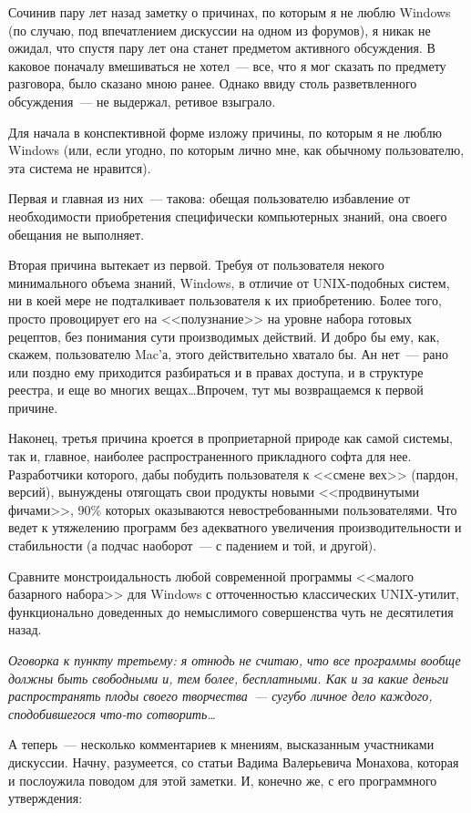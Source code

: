 Сочинив пару лет назад заметку о причинах, по которым я не люблю Windows (по случаю, под впечатлением дискуссии на одном из форумов), я никак не ожидал, что спустя пару  лет она станет предметом активного обсуждения. В каковое поначалу вмешиваться не хотел~--- все, что я мог сказать по предмету разговора, было сказано мною ранее. Однако ввиду столь разветвленного обсуждения~--- не выдержал, ретивое взыграло.

Для начала в конспективной форме изложу причины, по которым я не люблю Windows (или, если угодно, по которым лично мне, как обычному пользователю, эта система не нравится).

Первая и главная из них~--- такова: обещая пользователю избавление от необходимости приобретения специфически компьютерных знаний, она своего обещания не выполняет.

Вторая причина вытекает из первой. Требуя от пользователя некого минимального объема знаний, Windows, в отличие от UNIX-подобных систем, ни в коей мере не подталкивает пользователя к их приобретению. Более того, просто провоцирует его на <<полузнание>> на уровне набора готовых рецептов, без понимания сути производимых действий. И добро бы ему, как, скажем, пользователю Mac'а, этого действительно хватало бы. Ан нет~--- рано или поздно ему приходится разбираться и в правах доступа, и в структуре реестра, и еще во многих вещах\dots Впрочем, тут мы возвращаемся к первой причине.

Наконец, третья причина кроется в проприетарной природе как самой системы, так и, главное, наиболее распространенного прикладного софта для нее. Разработчики которого, дабы побудить пользователя к <<смене вех>> (пардон, версий), вынуждены отягощать свои продукты новыми <<продвинутыми фичами>>, 90\% которых оказываются невостребованными пользователями. Что ведет к утяжелению программ без адекватного увеличения производительности и стабильности (а подчас наоборот~--- с падением и той, и другой).

Сравните монстроидальность любой современной программы <<малого базарного набора>> для Windows с отточенностью классических UNIX-утилит, функционально доведенных до немыслимого совершенства чуть не десятилетия назад.


\textit{Оговорка к пункту третьему: я отнюдь не считаю, что все программы вообще должны быть свободными и, тем более, бесплатными. Как и за какие деньги распространять плоды своего творчества~--- сугубо личное дело каждого, сподобившегося что-то сотворить\dots}


А теперь~--- несколько комментариев к мнениям, высказанным участниками дискуссии. Начну, разумеется, со статьи Вадима Валерьевича Монахова, которая и послоужила поводом для этой заметки. И, конечно же, с его программного утверждения:


